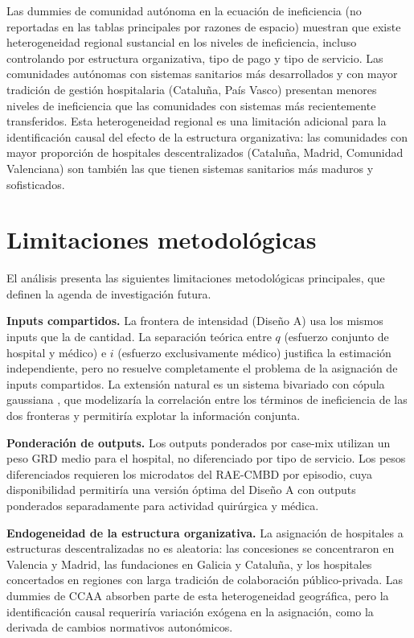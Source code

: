 Las dummies de comunidad autónoma en la ecuación de ineficiencia (no reportadas en las tablas principales por razones de espacio) muestran que existe heterogeneidad regional sustancial en los niveles de ineficiencia, incluso controlando por estructura organizativa, tipo de pago y tipo de servicio. Las comunidades autónomas con sistemas sanitarios más desarrollados y con mayor tradición de gestión hospitalaria (Cataluña, País Vasco) presentan menores niveles de ineficiencia que las comunidades con sistemas más recientemente transferidos. Esta heterogeneidad regional es una limitación adicional para la identificación causal del efecto de la estructura organizativa: las comunidades con mayor proporción de hospitales descentralizados (Cataluña, Madrid, Comunidad Valenciana) son también las que tienen sistemas sanitarios más maduros y sofisticados.

\section{Limitaciones metodológicas}

El análisis presenta las siguientes limitaciones metodológicas principales, que definen la agenda de investigación futura.

\textbf{Inputs compartidos.} La frontera de intensidad (Diseño A) usa los mismos inputs que la de cantidad. La separación teórica entre $q$ (esfuerzo conjunto de hospital y médico) e $i$ (esfuerzo exclusivamente médico) justifica la estimación independiente, pero no resuelve completamente el problema de la asignación de inputs compartidos. La extensión natural es un sistema bivariado con cópula gaussiana \citep{kumbhakar1997}, que modelizaría la correlación entre los términos de ineficiencia de las dos fronteras y permitiría explotar la información conjunta.

\textbf{Ponderación de outputs.} Los outputs ponderados por case-mix utilizan un peso GRD medio para el hospital, no diferenciado por tipo de servicio. Los pesos diferenciados requieren los microdatos del RAE-CMBD por episodio, cuya disponibilidad permitiría una versión óptima del Diseño A con outputs ponderados separadamente para actividad quirúrgica y médica.

\textbf{Endogeneidad de la estructura organizativa.} La asignación de hospitales a estructuras descentralizadas no es aleatoria: las concesiones se concentraron en Valencia y Madrid, las fundaciones en Galicia y Cataluña, y los hospitales concertados en regiones con larga tradición de colaboración público-privada. Las dummies de CCAA absorben parte de esta heterogeneidad geográfica, pero la identificación causal requeriría variación exógena en la asignación, como la derivada de cambios normativos autonómicos.

